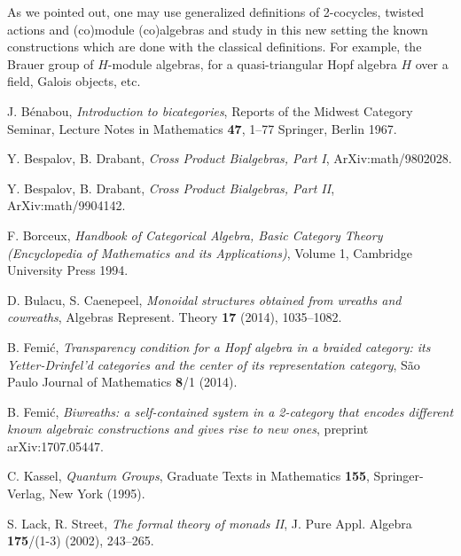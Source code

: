 \documentclass[a4paper, 12pt]{article}
\renewcommand{\_}[1]{\mbox{$_{\left( #1 \right)}$}}
\theoremstyle{plain}
\begin{document}
\medskip

As we pointed out, one may use generalized definitions of 2-cocycles, twisted actions and (co)module (co)algebras 
and study in this new setting the known constructions which are done with the classical definitions. For example, the Brauer group of $H$-module algebras, for a quasi-triangular Hopf algebra 
$H$ over a field, Galois objects, etc. 





\begin{thebibliography}{99}



 J. B\'enabou, \emph{Introduction to bicategories}, Reports of the Midwest Category Seminar, Lecture Notes in Mathematics \textbf{47}, 1--77 Springer, Berlin 1967. 


 Y. Bespalov, B. Drabant, {\em Cross Product Bialgebras, Part I}, ArXiv:math/9802028.


 Y. Bespalov, B. Drabant, {\em Cross Product Bialgebras, Part II}, ArXiv:math/9904142.


 F. Borceux,  \emph{Handbook of Categorical Algebra, Basic Category Theory (Encyclopedia of Mathematics and its Applications)},
Volume 1, Cambridge University Press 1994.


 D. Bulacu, S. Caenepeel, {\em Monoidal structures obtained from wreaths and cowreaths}, Algebras Represent. Theory {\bf 17} (2014), 1035--1082.



 B. Femi\'c, {\em Transparency condition for a Hopf algebra in a braided category: 
its Yetter-Drinfel'd categories and the center of its representation category}, S\~ao Paulo Journal of Mathematics {\bf 8}/1 (2014). 



 B. Femi\'c, {\em Biwreaths: a self-contained system in a 2-category that encodes different known algebraic constructions and gives rise to new ones}, 
preprint arXiv:1707.05447. 


 C. Kassel, {\em Quantum Groups}, Graduate Texts in Mathematics {\bf 155}, Springer-Verlag, New York (1995).


 S. Lack, R. Street, {\em The formal theory of monads II}, J. Pure Appl. Algebra {\bf 175}/(1-3) (2002), 243--265.



\end{thebibliography}
\end{document}
